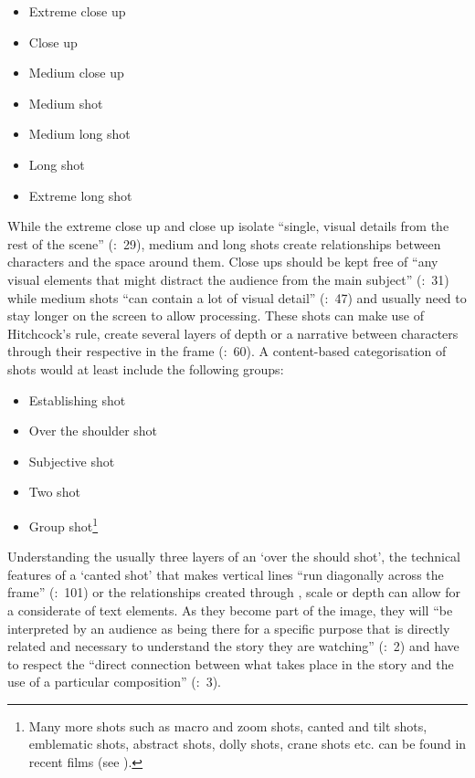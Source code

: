 \begin{itemize}
\item Extreme close up
\item Close up
\item Medium close up
\item Medium shot
\item Medium long shot
\item Long shot
\item Extreme long shot
\end{itemize}

While the extreme close up and close up isolate “single, visual details from the rest of the scene” (\citealt{mercado2010}:~29), medium and long shots create relationships between characters and the space around them. Close ups should be kept free of “any visual elements that might distract the audience from the main subject” (\citealt{mercado2010}:~31) while medium shots “can contain a lot of visual detail” (\citealt{mercado2010}:~47) and usually need to stay longer on the screen to allow processing. These shots can make use of Hitchcock’s rule, create several layers of depth or a narrative between characters through their respective  in the frame (\citealt{mercado2010}:~60). A content-based categorisation of shots would at least include the following groups:

\begin{itemize}
\item Establishing shot
\item Over the shoulder shot
\item Subjective shot
\item Two shot
\item Group shot\footnote{Many more shots such as macro and zoom shots, canted and tilt shots, emblematic shots, abstract shots, dolly shots, crane shots etc. can be found in recent films (see \citealt{mercado2010}).}
\end{itemize}

Understanding the usually three layers of an ‘over the should shot’, the technical features of a ‘canted shot’ that makes vertical lines “run diagonally across the frame” (\citealt{mercado2010}:~101) or the relationships created through , scale or depth can allow for a considerate  of text elements. As they become part of the image, they will “be interpreted by an audience as being there for a specific purpose that is directly related and necessary to understand the story they are watching” (\citealt{mercado2010}:~2) and have to respect the “direct connection between what takes place in the story and the use of a particular composition” (\citealt{mercado2010}:~3).



